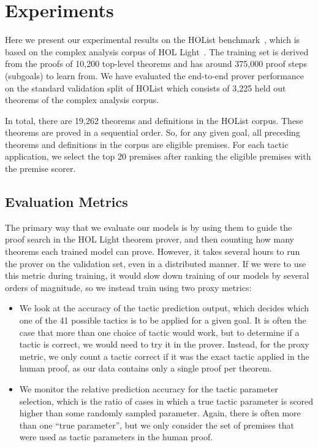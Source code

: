 \documentclass[letterpaper]{article} \usepackage{aaai20}  \usepackage{times}  \usepackage{helvet} \usepackage{courier}  \usepackage[hyphens]{url}  \usepackage{graphicx} \urlstyle{rm} \def\UrlFont{\rm}  \usepackage{graphicx}  \frenchspacing  \setlength{\pdfpagewidth}{8.5in}  \setlength{\pdfpageheight}{11in}
\newcommand{\citep}{\cite}
\begin{document}
 \section{Experiments}
\label{sec:experiments}

Here we present our experimental results on the HOList benchmark~\citep{bansal2019holist},
which is based on the complex analysis corpus of HOL Light~\citep{Harrison96}. The training set is derived from the proofs of 10,200 top-level theorems and has around 375,000 proof steps (subgoals) to learn from. We have evaluated the end-to-end prover performance on the standard validation split of HOList which consists of 3,225 held out theorems of the complex analysis corpus.

In total, there are 19,262 theorems and definitions in the HOList corpus.  These theorems are proved in a sequential order. So, for any given goal, all preceding theorems and definitions in the corpus are eligible premises.  For each tactic application, we select the top 20 premises after ranking the eligible premises with the premise scorer.

\subsection{Evaluation Metrics}

The primary way that we evaluate our models is by using them to guide the proof search in the HOL Light theorem prover, and then counting how many theorems each trained model can prove. However, it takes several hours to run the prover on the validation set, even in a distributed manner.  If we were to use this metric during training, it would slow down training of our models by several orders of magnitude, so we instead train using two proxy metrics: 
\begin{itemize}
    \item We look at the accuracy of the tactic prediction output, which decides which one of the 41 possible tactics is to be applied for a given goal.  It is often the case that more than one choice of tactic would work, but to determine if a tactic is correct, we would need to try it in the prover. Instead, for the proxy metric, we only count a tactic correct if it was the exact tactic applied in the human proof, as our data contains only a single proof per theorem.
    \item We monitor the relative prediction accuracy for the tactic parameter selection, which is the ratio of cases in which a true tactic parameter is scored higher than some randomly sampled parameter.  Again, there is often more than one ``true parameter'', but we only consider the set of premises that were used as tactic parameters in the human proof.
\end{itemize}
\end{document}
